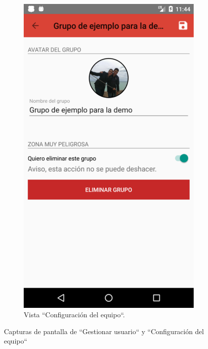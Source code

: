 \documentclass[twoside]{report}
\begin{document}
\begin{figure}[H]
\begin{center}
\begin{subfigure}[t]{.3\linewidth}
		\includegraphics[scale=0.2]{images/userguide/18.png}
		\caption{Vista “Configuración del equipo“.}
	\end{subfigure}\hspace{2mm}%
\caption{Capturas de pantalla de “Gestionar usuario“ y “Configuración del equipo“}
\end{center}
\end{figure}
\end{document}
